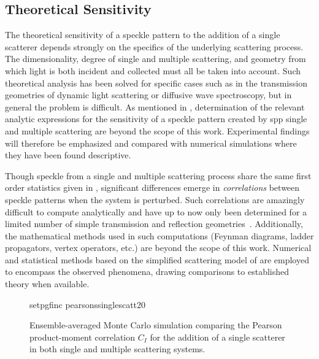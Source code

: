 \subsection{Theoretical Sensitivity}
The theoretical sensitivity of a speckle pattern to the addition of a single
scatterer depends strongly on the specifics of the underlying scattering
process.  The dimensionality, degree of single and multiple scattering, and
geometry from which light is both incident and collected must all be taken
into account.  Such theoretical analysis has been solved for specific cases
such as in the transmission geometries of dynamic light scattering or
diffusive wave spectroscopy, but in general the problem is difficult.  As
mentioned in , determination of the relevant analytic
expressions for the sensitivity of a speckle pattern created by \gls{spp} single and
multiple scattering are beyond the scope of this work.  Experimental findings
will therefore be emphasized and compared with numerical simulations where
they have been found descriptive.

Though speckle from a single and multiple scattering process share the same
first order statistics given in , significant differences
emerge in \textit{correlations} between speckle patterns when the system is
perturbed.  Such correlations are amazingly difficult to compute analytically
and have up to now only been determined for a limited number of simple
transmission and reflection geometries~\cite{berkovits1994correlations}.
Additionally, the mathematical methods used in such computations (Feynman
diagrams, ladder propagators, vertex operators, etc.) are beyond the scope of
this work.  Numerical and statistical methods based on the simplified
scattering model of  are employed
to encompass the observed phenomena, drawing comparisons to established theory
when available.

\begin{figure}
\centering
{setpgfinc}
{pearsonssinglescatt20}
\caption{Ensemble-averaged Monte Carlo simulation comparing the Pearson
product-moment correlation $C_I$ for the addition of a single scatterer in
both single and multiple scattering systems.}
\label{fig:scatteringpearson}
\end{figure}

